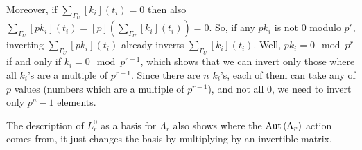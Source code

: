 Moreover, if $\sum_{\Gamma_U} [k_i]\left(t_i\right) = 0$ then also $\sum_{\Gamma_U} [p k_i]\left(t_i\right) = \left[p\right]\left(\sum_{\Gamma_U} [k_i]\left(t_i\right)\right) = 0$.
So, if any $p k_i$ is not $0$ modulo $p^r$, inverting $\sum_{\Gamma_U} [p k_i]\left(t_i\right)$ already inverts $\sum_{\Gamma_U} [k_i]\left(t_i\right)$.
Well, $p k_i = 0 \mod p^r$ if and only if $k_i = 0 \mod p^{r-1}$, which shows that we can invert only those where all $k_i$'s are a multiple of $p^{r-1}$.
Since there are $n$ $k_i$'s, each of them can take any of $p$ values (numbers which are a multiple of $p^{r-1}$), and not all $0$, we need to invert only $p^n - 1$ elements.

The description of $L_r^0$ as a basis for $\Lambda_r$ also shows where the $\operatorname{Aut} \left(\Lambda_r\right)$ action comes from, it just changes the basis by multiplying by an invertible matrix.

